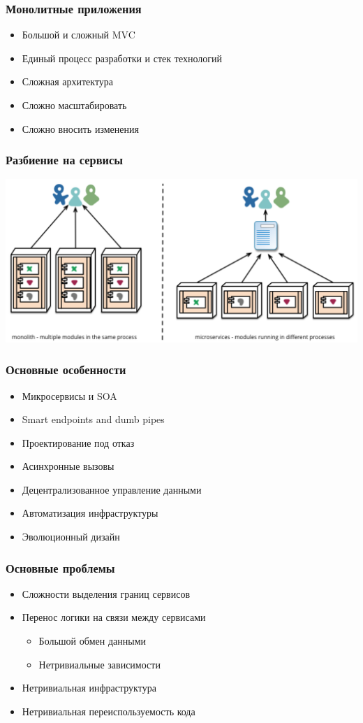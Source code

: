 \documentclass[xetex,mathserif,serif]{beamer}
\begin{document}
	\begin{frame}
		\frametitle{Монолитные приложения}
		\begin{itemize}
			\item Большой и сложный MVC
			\item Единый процесс разработки и стек технологий
			\item Сложная архитектура
			\item Сложно масштабировать
			\item Сложно вносить изменения
		\end{itemize}
	\end{frame}

	\begin{frame}
		\frametitle{Разбиение на сервисы}
		\begin{center}
			\includegraphics[width=\textwidth]{microservices.png}
		\end{center}
	\end{frame}

	\begin{frame}
		\frametitle{Основные особенности}
		\begin{itemize}
			\item Микросервисы и SOA
			\item Smart endpoints and dumb pipes
			\item Проектирование под отказ
			\item Асинхронные вызовы
			\item Децентрализованное управление данными
			\item Автоматизация инфраструктуры
			\item Эволюционный дизайн
		\end{itemize}
	\end{frame}

	\begin{frame}
		\frametitle{Основные проблемы}
		\begin{itemize}
			\item Сложности выделения границ сервисов
			\item Перенос логики на связи между сервисами
			\begin{itemize}
				\item Большой обмен данными
				\item Нетривиальные зависимости
			\end{itemize}
			\item Нетривиальная инфраструктура
			\item Нетривиальная переиспользуемость кода
		\end{itemize}
	\end{frame}
\end{document}
